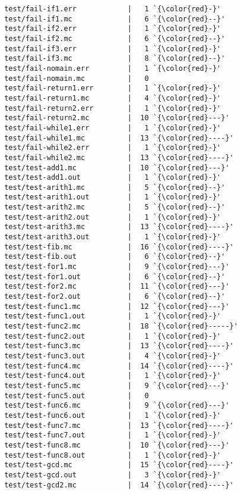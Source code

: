 \begin{lstlisting}
 test/fail-if1.err            |   1 `{\color{red}-}'
 test/fail-if1.mc             |   6 `{\color{red}--}'
 test/fail-if2.err            |   1 `{\color{red}-}'
 test/fail-if2.mc             |   6 `{\color{red}--}'
 test/fail-if3.err            |   1 `{\color{red}-}'
 test/fail-if3.mc             |   8 `{\color{red}--}'
 test/fail-nomain.err         |   1 `{\color{red}-}'
 test/fail-nomain.mc          |   0
 test/fail-return1.err        |   1 `{\color{red}-}'
 test/fail-return1.mc         |   4 `{\color{red}-}'
 test/fail-return2.err        |   1 `{\color{red}-}'
 test/fail-return2.mc         |  10 `{\color{red}---}'
 test/fail-while1.err         |   1 `{\color{red}-}'
 test/fail-while1.mc          |  13 `{\color{red}----}'
 test/fail-while2.err         |   1 `{\color{red}-}'
 test/fail-while2.mc          |  13 `{\color{red}----}'
 test/test-add1.mc            |  10 `{\color{red}---}'
 test/test-add1.out           |   1 `{\color{red}-}'
 test/test-arith1.mc          |   5 `{\color{red}--}'
 test/test-arith1.out         |   1 `{\color{red}-}'
 test/test-arith2.mc          |   5 `{\color{red}--}'
 test/test-arith2.out         |   1 `{\color{red}-}'
 test/test-arith3.mc          |  13 `{\color{red}----}'
 test/test-arith3.out         |   1 `{\color{red}-}'
 test/test-fib.mc             |  16 `{\color{red}----}'
 test/test-fib.out            |   6 `{\color{red}--}'
 test/test-for1.mc            |   9 `{\color{red}---}'
 test/test-for1.out           |   6 `{\color{red}--}'
 test/test-for2.mc            |  11 `{\color{red}---}'
 test/test-for2.out           |   6 `{\color{red}--}'
 test/test-func1.mc           |  12 `{\color{red}---}'
 test/test-func1.out          |   1 `{\color{red}-}'
 test/test-func2.mc           |  18 `{\color{red}-----}'
 test/test-func2.out          |   1 `{\color{red}-}'
 test/test-func3.mc           |  13 `{\color{red}----}'
 test/test-func3.out          |   4 `{\color{red}-}'
 test/test-func4.mc           |  14 `{\color{red}----}'
 test/test-func4.out          |   1 `{\color{red}-}'
 test/test-func5.mc           |   9 `{\color{red}---}'
 test/test-func5.out          |   0
 test/test-func6.mc           |   9 `{\color{red}---}'
 test/test-func6.out          |   1 `{\color{red}-}'
 test/test-func7.mc           |  13 `{\color{red}----}'
 test/test-func7.out          |   1 `{\color{red}-}'
 test/test-func8.mc           |  10 `{\color{red}---}'
 test/test-func8.out          |   1 `{\color{red}-}'
 test/test-gcd.mc             |  15 `{\color{red}----}'
 test/test-gcd.out            |   3 `{\color{red}-}'
 test/test-gcd2.mc            |  14 `{\color{red}----}'

\end{lstlisting}
